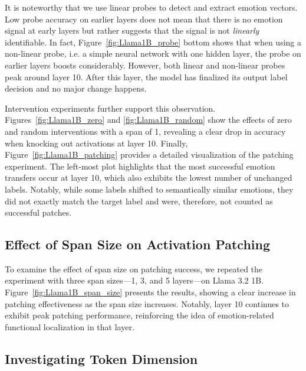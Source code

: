 It is noteworthy that we use linear probes to detect and extract emotion vectors. Low probe accuracy on earlier layers does not mean that there is no emotion signal at early layers but rather suggests that the signal is not \textit{linearly} identifiable. In fact, Figure~\ref{fig:Llama1B_probe} bottom shows that when using a non-linear probe, i.e. a simple neural network with one hidden layer, the probe on earlier layers boosts considerably. However, both linear and non-linear probes peak around layer 10. After this layer, the model has finalized its output label decision and no major change happens. 

Intervention experiments further support this observation. Figures~\ref{fig:Llama1B_zero} and \ref{fig:Llama1B_random} show the effects of zero and random interventions with a span of 1, revealing a clear drop in accuracy when knocking out activations at layer 10. Finally, Figure~\ref{fig:Llama1B_patching} provides a detailed visualization of the patching experiment. The left-most plot highlights that the most successful emotion transfers occur at layer 10, which also exhibits the lowest number of unchanged labels. Notably, while some labels shifted to semantically similar emotions, they did not exactly match the target label and were, therefore, not counted as successful patches.



\subsection{Effect of Span Size on Activation Patching} \label{app:Span}
To examine the effect of span size on patching success, we repeated the experiment with three span sizes—1, 3, and 5 layers—on Llama 3.2 1B. Figure~\ref{fig:Llama1B_span_size} presents the results, showing a clear increase in patching effectiveness as the span size increases. Notably, layer 10 continues to exhibit peak patching performance, reinforcing the idea of emotion-related functional localization in that layer.




\subsection{Investigating Token Dimension} \label{app:token}

